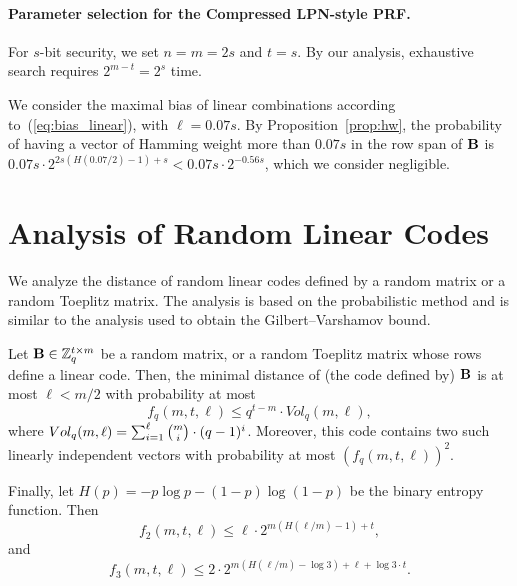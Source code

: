 \paragraph{Parameter selection for the Compressed LPN-style PRF.}
For $s$-bit security, we set $n=m= 2s$ and $t =s$.
By our analysis, exhaustive search requires $2^{m - t} = 2^s$ time.

We consider the maximal bias of linear combinations according to~(\ref{eq:bias_linear}),
with $\ell = 0.07 s$.
By Proposition~\ref{prop:hw},
the probability of having a vector of Hamming weight more than $0.07 s$
in the row span of $\mat{B}$ is
$0.07 s \cdot 2^{2s (H(0.07/2) - 1) + s} < 0.07 s \cdot 2^{-0.56 s}$,
which we consider negligible.


\section{Analysis of Random Linear Codes}
\label{app:distance}

We analyze the distance of random linear codes defined by a random matrix
or a random Toeplitz matrix.
The analysis is based on the probabilistic method and is
similar to the analysis used to obtain the Gilbert–Varshamov bound.

\begin{proposition}
\label{prop:hw}
Let $\mat{B} \in \Z^{t \times m}_{q}$ be a random matrix, or a random Toeplitz matrix whose rows define
a linear code.
Then, the minimal distance of (the code defined by) $\mat{B}$ is at most $\ell < m/2$ with probability at most
$$f_q(m,t,\ell) \leq q^{t-m} \cdot Vol_q(m,\ell),$$
where $Vol_q(m,\ell) = \sum_{i=1}^\ell \tbinom{m}{i} \cdot (q-1)^{i}$.
Moreover, this code contains two such linearly independent vectors with probability at most $(f_q(m,t,\ell))^2$.

Finally, let $H(p) = - p \log p - (1-p) \log(1-p)$ be the binary entropy function.
Then
$$f_2(m,t,\ell) \leq \ell \cdot 2^{m (H(\ell/m) - 1) + t},$$
and
$$f_3(m,t,\ell) \leq 2 \cdot 2^{m (H(\ell/m) - \log 3) + \ell + \log 3 \cdot t}.$$
\end{proposition}

